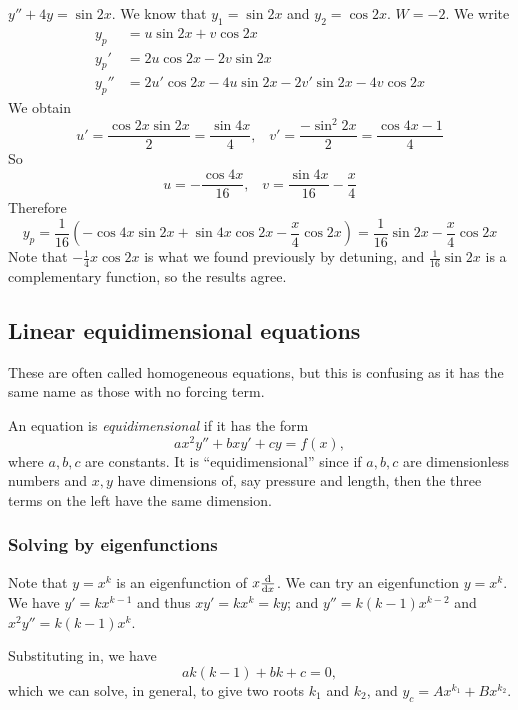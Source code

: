 \documentclass[a4paper]{article}
\begin{document}
  \begin{eg}
    $y'' + 4y = \sin 2x$. We know that $y_1 = \sin 2x$ and $y_2 = \cos 2x$. $W = -2$. We write
    \begin{align*}
      y_p &= u\sin 2x + v\cos 2x\\
      y_p' &= 2u\cos 2x - 2v\sin 2x\\
      y_p'' &= 2u'\cos 2x - 4u\sin 2x - 2v' \sin 2x - 4v\cos 2x
    \end{align*}
    We obtain 
    \[
      u' = \frac{\cos 2x\sin 2x}{2} = \frac{\sin 4x}{4},\;\;\; v' = \frac{-\sin^2 2x}{2} = \frac{\cos 4x - 1}{4}
    \]
    So 
    \[
      u = -\frac{\cos 4x}{16}, \;\;\; v = \frac{\sin 4x}{16} - \frac{x}{4}
    \]
    Therefore
    \[
      y_p = \frac{1}{16}(-\cos 4x\sin 2x + \sin 4x\cos 2x - \frac{x}{4}\cos 2x) = \frac{1}{16}\sin 2x - \frac{x}{4}\cos 2x
    \]
    Note that $-\frac{1}{4}x\cos 2x$ is what we found previously by detuning, and $\frac{1}{16}\sin 2x$ is a complementary function, so the results agree.
  \end{eg}

  \subsection{Linear equidimensional equations}
  \note These are often called homogeneous equations, but this is confusing as it has the same name as those with no forcing term.

  \begin{defi}
    An equation is \emph{equidimensional} if it has the form
    \[
      ax^2y'' + bxy' + cy = f(x),
    \]
    where $a, b, c$ are constants. It is ``equidimensional'' since if $a, b, c$ are dimensionless numbers and $x, y$ have dimensions of, say pressure and length, then the three terms on the left have the same dimension.
  \end{defi}

  \subsubsection{Solving by eigenfunctions}
  Note that $y = x^k$ is an eigenfunction of $x\frac{\mathrm{d}}{\mathrm{d} x}$. We can try an eigenfunction $y = x^k$. We have $y' = kx^{k - 1}$ and thus $xy' = kx^k = ky$; and $y'' = k(k - 1)x^{k - 2}$ and $x^2y'' = k(k - 1)x^k$.

  Substituting in, we have
  \[
    ak(k - 1) + bk + c = 0,
  \]
  which we can solve, in general, to give two roots $k_1$ and $k_2$, and $y_c = Ax^{k_1} + Bx^{k_2}$.
\end{document}
